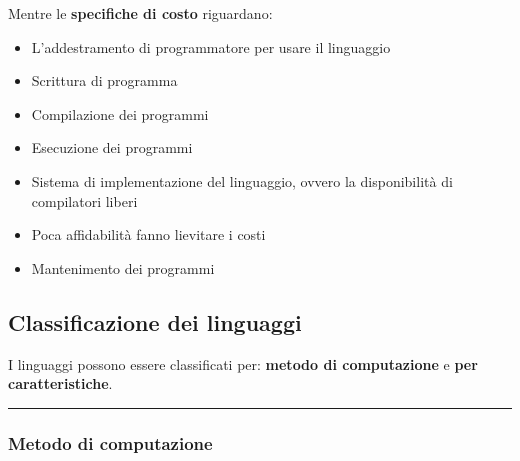 \documentclass[a4paper]{article}
\newcommand{\longline}{\noindent\rule{\textwidth}{0.4pt}}
\begin{document}
	\noindent
	Mentre le \textbf{specifiche di costo} riguardano:
	\begin{itemize}
		\item L'addestramento di programmatore per usare il linguaggio
		\item Scrittura di programma
		\item Compilazione dei programmi
		\item Esecuzione dei programmi
		\item Sistema di implementazione del linguaggio, ovvero la disponibilità di compilatori liberi
		\item Poca affidabilità fanno lievitare i costi
		\item Mantenimento dei programmi
	\end{itemize}\newpage

	\subsection{Classificazione dei linguaggi}
	
	I linguaggi possono essere classificati per: \textbf{metodo di computazione} e \textbf{per caratteristiche}.
	
	\longline
	
	\subsubsection{Metodo di computazione}
	
\end{document}
